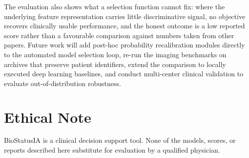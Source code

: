 \documentclass[conference]{IEEEtran}
\begin{document}
The evaluation also shows what a selection function cannot fix: where the underlying feature representation carries little discriminative signal, no objective recovers clinically usable performance, and the honest outcome is a low reported score rather than a favourable comparison against numbers taken from other papers. Future work will add post-hoc probability recalibration modules directly to the automated model selection loop, re-run the imaging benchmarks on archives that preserve patient identifiers, extend the comparison to locally executed deep learning baselines, and conduct multi-center clinical validation to evaluate out-of-distribution robustness.

\section*{Ethical Note}
BioStatusIA is a clinical decision support tool. None of the models, scores, or reports described here substitute for evaluation by a qualified physician.
\end{document}
